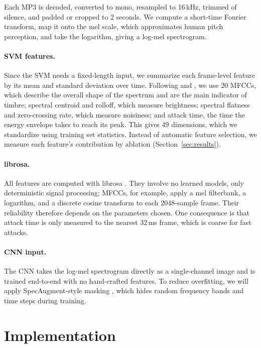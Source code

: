 \documentclass[11pt]{article}
\begin{document}
Each MP3 is decoded, converted to mono, resampled to 16\,kHz, trimmed of silence, and padded or cropped to 2 seconds. We compute a short-time Fourier transform, map it onto the mel scale, which approximates human pitch perception, and take the logarithm, giving a log-mel spectrogram.

\paragraph{SVM features.} Since the SVM needs a fixed-length input, we summarize each frame-level feature by its mean and standard deviation over time. Following \citet{eronen2000musical} and \citet{herrera2003automatic}, we use 20 MFCCs, which describe the overall shape of the spectrum and are the main indicator of timbre; spectral centroid and rolloff, which measure brightness; spectral flatness and zero-crossing rate, which measure noisiness; and attack time, the time the energy envelope takes to reach its peak. This gives 49 dimensions, which we standardize using training set statistics. Instead of automatic feature selection, we measure each feature's contribution by ablation (Section~\ref{sec:results}).

\paragraph{librosa.} All features are computed with librosa \citep{mcfee2015librosa}. They involve no learned models, only deterministic signal processing; MFCCs, for example, apply a mel filterbank, a logarithm, and a discrete cosine transform to each 2048-sample frame. Their reliability therefore depends on the parameters chosen. One consequence is that attack time is only measured to the nearest 32\,ms frame, which is coarse for fast attacks.

\paragraph{CNN input.} The CNN takes the log-mel spectrogram directly as a single-channel image and is trained end-to-end with no hand-crafted features. To reduce overfitting, we will apply SpecAugment-style masking \citep{park2019specaugment}, which hides random frequency bands and time steps during training.

\section{Implementation}
\end{document}
